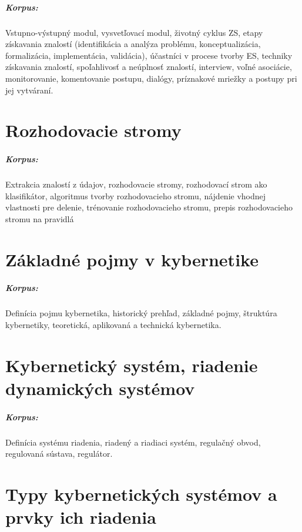 \documentclass[11pt,a4paper]{report}
\begin{document}
\paragraph{Korpus:} Vstupno-výstupný modul, vysvetľovací modul, životný cyklus ZS, etapy získavania znalostí (identifikácia a analýza problému, konceptualizácia, formalizácia, implementácia, validácia), účastníci v procese tvorby ES, techniky získavania znalostí, spoľahlivosť a neúplnosť znalostí, interview, voľné asociácie, monitorovanie, komentovanie postupu, dialógy, príznakové mriežky a postupy pri jej vytváraní.

\chapter{Rozhodovacie stromy}

\paragraph{Korpus:} Extrakcia znalostí z údajov, rozhodovacie stromy, rozhodovací strom ako klasifikátor, algoritmus tvorby rozhodovacieho stromu, nájdenie vhodnej vlastnosti pre delenie, trénovanie rozhodovacieho stromu, prepis rozhodovacieho stromu na pravidlá

\chapter{Základné pojmy v kybernetike}

\paragraph{Korpus:} Definícia pojmu kybernetika, historický prehľad, základné pojmy, štruktúra kybernetiky, teoretická, aplikovaná a technická kybernetika.

\chapter{Kybernetický systém, riadenie dynamických systémov}

\paragraph{Korpus:} Definícia systému riadenia, riadený a riadiaci systém, regulačný obvod, regulovaná sústava, regulátor.

\chapter{Typy kybernetických systémov a prvky ich riadenia}
\end{document}
